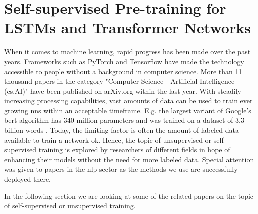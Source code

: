 \section{Self-supervised Pre-training for LSTMs and Transformer Networks}

When it comes to machine learning, rapid progress has been made over the past years. Frameworks such as PyTorch \cite{pytorch} and Tensorflow \cite{tensorflow} have made the technology accessible to people without a background in computer science. More than 11 thousand papers in the category "Computer Science - Artificial Intelligence (cs.AI)" have been published on arXiv.org \cite{arxiv} within the last year. With steadily increasing processing capabilities, vast amounts of data can be used to train ever growing \glspl{nn} within an acceptable timeframe.  E.g. the largest variant of Google's \gls{bert} algorithm has 340 million parameters and was trained on a dataset of 3.3 billion words \cite{bert}. Today, the limiting factor is often the amount of labeled data available to train a network ok. Hence, the topic of unsupervised or self-supervised training is explored by researchers of different fields in hope of enhancing their models without the need for more labeled data. Special attention was given to papers in the \gls{nlp} sector as the methods we use are successfully deployed there. 

In the following section we are looking at some of the related papers on the topic of self-supervised  or unsupervised training. \par



